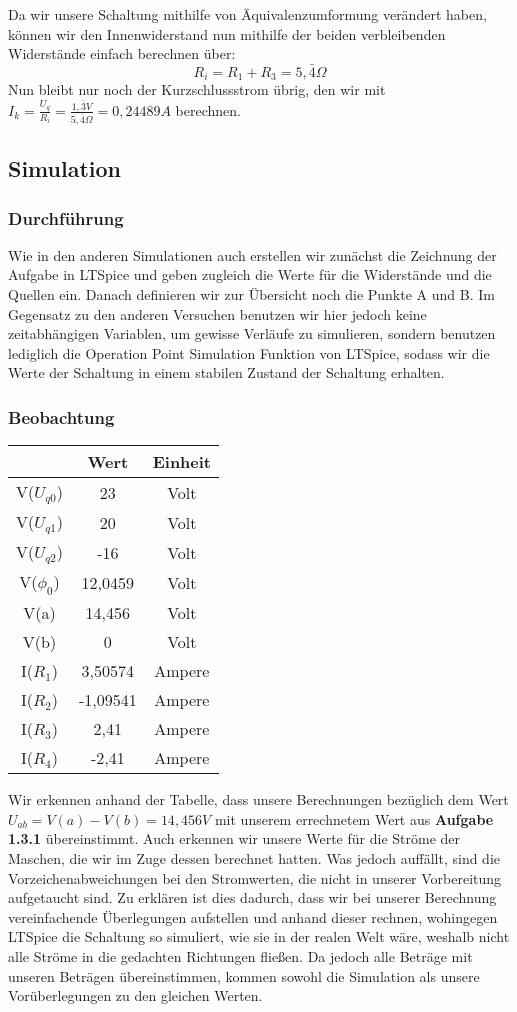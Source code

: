 \documentclass{scrarticle}
\begin{document}
Da wir unsere Schaltung mithilfe von Äquivalenzumformung verändert haben, können wir den Innenwiderstand nun mithilfe der beiden verbleibenden Widerstände einfach berechnen über:
\begin{equation*}
  R_i = R_1 + R_3 = 5,\bar{4}\Omega 
\end{equation*}
Nun bleibt nur noch der Kurzschlussstrom übrig, den wir mit $I_k = \frac{U_q}{R_i} = \frac{1,\bar{3}V}{5,\bar{4}\Omega} = 0,24489A$ berechnen.
\subsection{Simulation}
\subsubsection{Durchführung}
Wie in den anderen Simulationen auch erstellen wir zunächst die Zeichnung der Aufgabe in LTSpice und geben zugleich die Werte für die Widerstände
und die Quellen ein. Danach definieren wir zur Übersicht noch die Punkte A und B.
Im Gegensatz zu den anderen Versuchen benutzen wir hier jedoch keine zeitabhängigen Variablen, um gewisse Verläufe zu simulieren, sondern benutzen lediglich die Operation Point Simulation Funktion von LTSpice,
sodass wir die Werte der Schaltung in einem stabilen Zustand der Schaltung erhalten.
\subsubsection{Beobachtung}
  \begin{center}
    \begin{tabular}{ c| c| c }
      & Wert & Einheit \\ 
     \hline
     V($U_{q0}$) & 23 & Volt\\
     V($U_{q1}$) & 20 & Volt \\
     V($U_{q2}$) & -16 & Volt \\
     V($\phi_0$) & 12,0459 & Volt \\
     V(a) & 14,456 & Volt \\  
     V(b) & 0 & Volt     \\
     I($R_1$) & 3,50574 & Ampere \\
     I($R_2$) & -1,09541 & Ampere \\
     I($R_3$) & 2,41 & Ampere \\
     I($R_4$) & -2,41 & Ampere
    \end{tabular}
    \end{center}
Wir erkennen anhand der Tabelle, dass unsere Berechnungen bezüglich dem Wert $U_{ab} = V(a) - V(b) = 14,456V$ mit unserem errechnetem Wert aus \textbf{Aufgabe 1.3.1}
übereinstimmt. Auch erkennen wir unsere Werte für die Ströme der Maschen, die wir im Zuge dessen berechnet hatten. 
Was jedoch auffällt, sind die Vorzeichenabweichungen bei den Stromwerten, die nicht in unserer Vorbereitung aufgetaucht sind. Zu erklären ist dies dadurch, dass wir bei unserer Berechnung vereinfachende Überlegungen aufstellen und anhand dieser rechnen,
wohingegen LTSpice die Schaltung so simuliert, wie sie in der realen Welt wäre, weshalb nicht alle Ströme in die gedachten Richtungen fließen. Da jedoch alle Beträge mit unseren Beträgen übereinstimmen, kommen sowohl die Simulation als unsere
Vorüberlegungen zu den gleichen Werten. 
\end{document}

